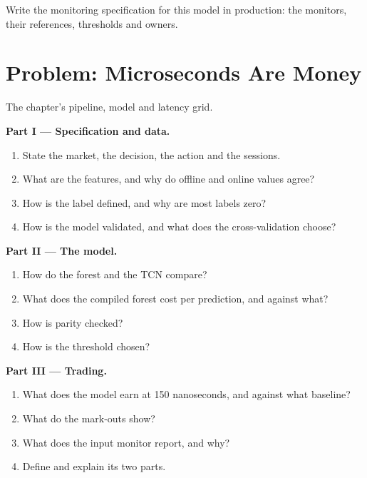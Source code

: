 \begin{exercise}[$\star\star\star$]\label{exo:ml:build-an-order-book-model-end-to-end:8}
Write the monitoring specification for this model in production: the monitors, their references, thresholds and owners.
\end{exercise}

\section{Problem: Microseconds Are Money}

\begin{problem}\label{pb:ml:build-an-order-book-model-end-to-end:1}
The chapter's pipeline, model and latency grid.

\medskip\noindent\textbf{Part I --- Specification and data.}
\begin{enumerate}
\item State the market, the decision, the action and the sessions.
\item What are the features, and why do offline and online values agree?
\item How is the label defined, and why are most labels zero?
\item How is the model validated, and what does the cross-validation choose?
\end{enumerate}

\medskip\noindent\textbf{Part II --- The model.}
\begin{enumerate}[resume]
\item How do the forest and the TCN compare?
\item What does the compiled forest cost per prediction, and against what?
\item How is parity checked?
\item How is the threshold chosen?
\end{enumerate}

\medskip\noindent\textbf{Part III --- Trading.}
\begin{enumerate}[resume]
\item What does the model earn at 150 nanoseconds, and against what baseline?
\item What do the mark-outs show?
\item What does the input monitor report, and why?
\item Define  and explain its two parts.
\end{enumerate}


\end{problem}
